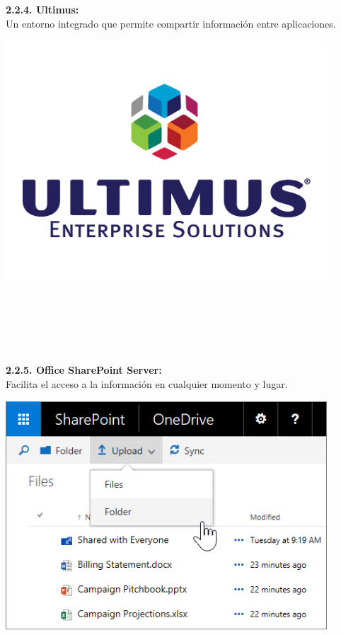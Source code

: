 \begin{flushleft}
\textbf{2.2.4. Ultimus: }\\
Un entorno integrado que permite compartir información entre aplicaciones.
	\begin{center}
	\includegraphics[width=12cm]{./Imagenes/BIimagen4}
	\end{center}
	
\textbf{}\\
\textbf{}\\
\textbf{}\\
\textbf{}\\
\textbf{}\\
\textbf{2.2.5. Office SharePoint Server: }\\
Facilita el acceso a la información en cualquier momento y lugar.
	\begin{center}
	\includegraphics[width=12cm]{./Imagenes/BIimagen5}
	\end{center}
	\textbf{}\\


\end{flushleft}
